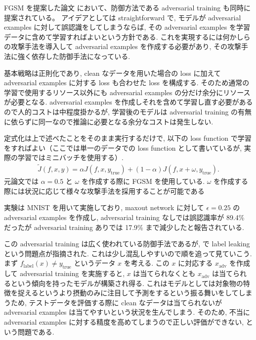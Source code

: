 FGSM を提案した論文 \cite{goodfellow2014explaining} において、防御方法である adversarial training も同時に提案されている。
アイデアとしては straightforward で, モデルが adversarial examples に対して誤認識をしてしまうならば, その adversarial examples を学習データに含めて学習すればよいという方針である.
これを実現するには何かしらの攻撃手法を導入して adversarial examples を作成する必要があり, その攻撃手法に強く依存した防御手法になっている.

基本戦略は正則化であり, clean なデータを用いた場合の loss に加えて adversarial examples に対する loss も合わせた loss を構成する.
そのため通常の学習で使用するリソース以外にも adversarial examples の分だけ余分にリソースが必要となる.
adversarial examples を作成しそれを含めて学習し直す必要があるので人的コストは中程度掛かるが, 学習後のモデルは adversarial training の有無に依らずに同一なので推論に必要となる余分なコストは発生しない.

定式化は上で述べたことをそのまま実行するだけで, 以下の loss function で学習をすればよい（ここでは単一のデータでの loss function として書いているが, 実際の学習ではミニバッチを使用する）.
%
\begin{eqnarray}
\tilde{J} (f, x, y) = \alpha J (f, x, y_{\text{true}}) + (1 - \alpha) J (f, x + \omega, y_{\text{true}}).
\label{eq:explaining-and-loss}
\end{eqnarray}
%
元論文では $\alpha = 0.5$ と $\omega$ を作成する際に FGSM を使用している.
$\omega$ を作成する際には状況に応じて様々な攻撃手法を採用することが可能である

実験は MNIST を用いて実施しており, maxout network \cite{goodfellow2013maxout} に対して $\epsilon = 0.25$ の adversarial examples を作成し, adversarial training なしでは誤認識率が 89.4\% だったが adversarial training ありでは 17.9\% まで減少したと報告されている.

この adversarial training は広く使われている防御手法であるが, \cite{kurakin2016adversarial} で label leaking という問題点が指摘された.
これは少し混乱しやすいので順を追って見ていこう.
まず $f_{\text{label}} (x) \neq y_{\text{true}}$ というデータ $x$ を考える.
この $x$ に対応する $x_{\text{adv}}$ を作成して adversarial training を実施すると, $x$ は当てられなくとも $x_{\text{adv}}$ は当てられるという傾向を持ったモデルが構築され得る.
これはモデルとしては対象物の特徴を捉えるというより摂動のみに注目して予測をするという振る舞いをしてしまうため, テストデータを評価する際に clean なデータは当てられないが adversarial examples は当てやすいという状況を生んでしまう.
そのため, 不当に adversarial examples に対する精度を高めてしまうので正しい評価ができない, という問題である.

